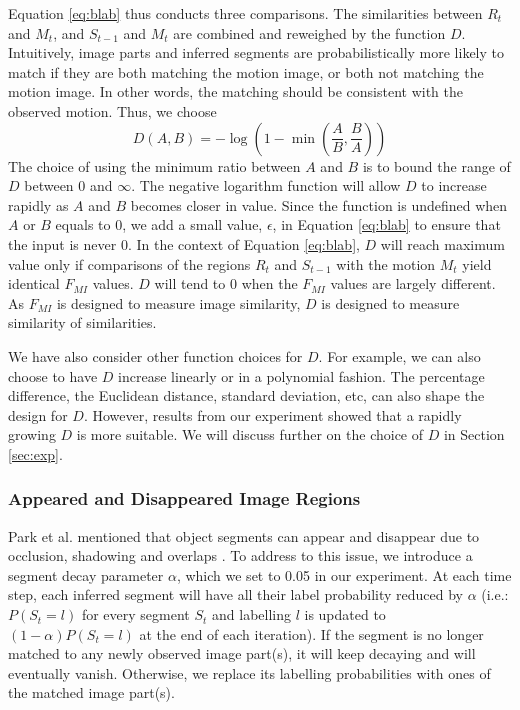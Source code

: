 \documentclass{article}
\begin{document}
Equation \ref{eq:blab} thus conducts three comparisons. The similarities between $R_t$ and $M_t$, and $S_{t-1}$ and $M_t$ are combined and reweighed by the function $D$. Intuitively, image parts and inferred segments are probabilistically more likely to match if they are both matching the motion image, or both not matching the motion image. In other words, the matching should be consistent with the observed motion. Thus, we choose
\begin{equation}
	D(A,B) = -\log\left(1-\min\left(\frac{A}{B}, \frac{B}{A}\right)\right)
\end{equation}
The choice of using the minimum ratio between $A$ and $B$ is to bound the range of $D$ between $0$ and $\infty$. The negative logarithm function will allow $D$ to increase rapidly as $A$ and $B$ becomes closer in value. Since the function is undefined when $A$ or $B$ equals to 0, we add a small value, $\epsilon$, in Equation \ref{eq:blab} to ensure that the input is never 0. In the context of Equation \ref{eq:blab}, $D$ will reach maximum value only if comparisons of the regions $R_t$ and $S_{t-1}$ with the motion $M_t$ yield identical $F_{MI}$ values. $D$ will tend to 0 when the $F_{MI}$ values are largely different. As $F_{MI}$ is designed to measure image similarity, $D$ is designed to measure similarity of similarities.

We have also consider other function choices for $D$. For example, we can also choose to have $D$ increase linearly or in a polynomial fashion. The percentage difference, the Euclidean distance, standard deviation, etc, can also shape the design for $D$. However, results from our experiment showed that a rapidly growing $D$ is more suitable. We will discuss further on the choice of $D$ in Section \ref{sec:exp}.

\subsubsection{Appeared and Disappeared Image Regions}

Park et al. mentioned that object segments can appear and disappear due to occlusion, shadowing and overlaps \cite{human-action}. To address to this issue, we introduce a segment decay parameter $\alpha$, which we set to 0.05 in our experiment. At each time step, each inferred segment will have all their label probability reduced by $\alpha$ (i.e.: $P(S_{t} = l)$ for every segment $S_t$ and labelling $l$ is updated to $(1-\alpha)P(S_{t} = l)$ at the end of each iteration). If the segment is no longer matched to any newly observed image part(s), it will keep decaying and will eventually vanish. Otherwise, we replace its labelling probabilities with ones of the matched image part(s). 
\end{document}

